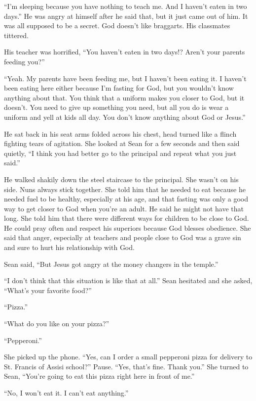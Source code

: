 \documentclass[12pt]{article}
\begin{document}
“I’m sleeping because you have nothing to teach me. And I haven’t eaten in two days.” 
He was angry at himself after he said that, but it just came out of him. It was all supposed to be a secret. 
God doesn’t like braggarts.  
His classmates tittered.

His teacher was horrified, “You haven’t eaten in two days!? Aren’t your parents feeding you?” 

“Yeah.  My parents have been feeding me, but I haven’t been eating it.  I haven’t been eating here either because I’m fasting for God, but you wouldn’t know anything about that. 
You think that a uniform makes you closer to God, but it doesn’t. 
You need to give up something you need, but all you do is wear a uniform and yell at kids all day. 
You don’t know anything about God or Jesus.”

He sat back in his seat arms folded across his chest, head turned like a flinch fighting tears of agitation. She looked at Sean for a few seconds and then said quietly, “I think you had better go to the principal and repeat what you just said.”

He walked shakily down the steel staircase to the principal. 
She wasn’t on his side. 
Nuns always stick together. 
She told him that he needed to eat because he needed fuel to be healthy, especially at his age, and that fasting was only a good way to get closer to God when you’re an adult. He said he might not have that long. 
She told him that there were different ways for children to be close to God. 
He could pray often and respect his superiors because God blesses obedience. 
She said that anger, especially at teachers and people close to God was a grave sin and sure to hurt his relationship with God.

Sean said, “But Jesus got angry at the money changers in the temple.”

“I don’t think that this situation is like that at all.” Sean hesitated and she asked, “What’s your favorite food?”

“Pizza.”

“What do you like on your pizza?” 

“Pepperoni.”

She picked up the phone. “Yes, can I order a small pepperoni pizza for delivery to St. Francis of Assisi school?” Pause. “Yes, that’s fine. Thank you.” She turned to Sean, “You’re going to eat this pizza right here in front of me.”

“No, I won’t eat it.  I can’t eat anything.” 
\end{document}
